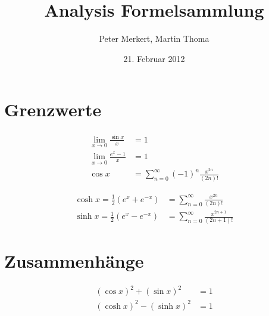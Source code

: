 \documentclass[a4paper,10pt]{article}
\begin{document}
\title{Analysis Formelsammlung}
\author{Peter Merkert, Martin Thoma}
\date{21. Februar 2012}

\section{Grenzwerte}
\begin{table}[ht]
\begin{minipage}[b]{0.5\linewidth}\centering
\begin{align*}
  \lim_{x \to 0} \frac {\sin x}{x}  &= 1 \\
  \lim_{x \to 0} \frac {e^x - 1}{x} &= 1 \\
  \cos x &= \sum_{n = 0}^{\infty} (-1)^n \frac {x^{2n}}{(2n)!}
\end{align*}
\end{minipage}
\hspace{0.5cm}
\begin{minipage}[b]{0.5\linewidth}\centering
\begin{align*}
\cosh x = \frac {1}{2} (e^x + e^{-x}) &= \sum_{n = 0}^{\infty} \frac {x^{2n}}{(2n)!} \\
\sinh x = \frac {1}{2} (e^x - e^{-x}) &= \sum_{n = 0}^{\infty} \frac {x^{2n + 1}}{(2n + 1)!}
\end{align*}
\end{minipage}
\end{table}

\section{Zusammenhänge}
\begin{align*}
  (\cos x)^2 + (\sin x)^2 &= 1 \\
  (\cosh x)^2 - (\sinh x)^2 &= 1
\end{align*}
\end{document}
